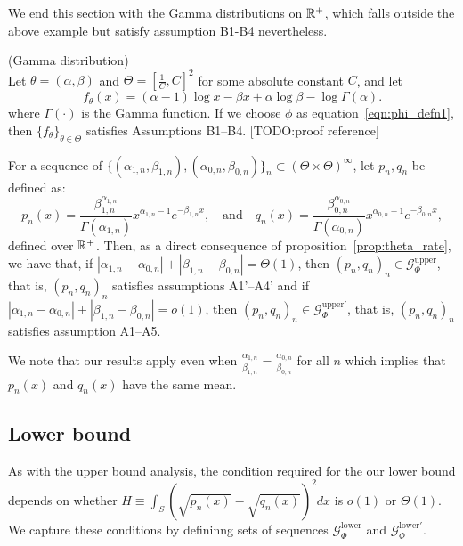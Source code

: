 \documentclass{article}
\begin{document}
We end this section with the Gamma distributions on ${\mathbb R}^+$, which falls outside the above example but satisfy assumption B1-B4 nevertheless.

\begin{example} (Gamma distribution)\\

Let $\theta = (\alpha, \beta)$ and $\Theta = [\frac{1}{C}, C]^2$ for some absolute constant $C$, and let
$$
f_{\theta}(x) = (\alpha - 1) \log x - \beta x + \alpha \log \beta - \log \Gamma(\alpha).
$$
where $\Gamma(\cdot)$ is the Gamma function. If we choose $\phi$ as equation~\eqref{eqn:phi_defn1}, then $\{ f_\theta \}_{\theta \in \Theta}$ satisfies Assumptions B1--B4. [TODO:proof reference]



For a sequence of $\{(\alpha_{1,n}, \beta_{1,n}), (\alpha_{0,n}, \beta_{0,n})\}_n \subset (\Theta \times \Theta)^\infty$, let $p_n, q_n$ be defined as:
\[
p_n(x) = \frac{\beta_{1,n}^{\alpha_{1,n}}}{\Gamma(\alpha_{1,n})} x^{\alpha_{1,n} - 1} e^{- \beta_{1,n} x}, \quad \text{and} \quad
q_n(x) = \frac{\beta_{0,n}^{\alpha_{0,n}}}{\Gamma(\alpha_{0,n})} x^{\alpha_{0,n} - 1} e^{- \beta_{0,n} x},
\]
defined over ${\mathbb R}^+$. Then, as a direct consequence of proposition~\ref{prop:theta_rate}, we have that, if $|\alpha_{1,n} - \alpha_{0,n}| + |\beta_{1,n} - \beta_{0,n} |  = \Theta(1)$, then $(p_n, q_n)_n \in \mathcal{G}^{\textrm{upper}}_\Phi$, that is, $(p_n, q_n)_n$ satisfies assumptions A1'--A4' and if  $ |\alpha_{1,n} - \alpha_{0,n}| + |\beta_{1,n} - \beta_{0,n}| = o(1)$, then $(p_n, q_n)_n \in \mathcal{G}^{\textrm{upper} \prime}_\Phi$, that is, $(p_n, q_n)_n$ satisfies assumption A1--A5.

\end{example}

We note that our results apply even when $\frac{\alpha_{1,n}}{\beta_{1,n}} = \frac{\alpha_{0,n}}{\beta_{0,n}}$ for all $n$ which implies that $p_n(x)$ and $q_n(x)$ have the same mean.


\subsection{Lower bound}
\label{sec:lower_bound}


As with the upper bound analysis, the condition required for the our lower bound depends on whether $H \equiv \int_S (\sqrt{p_n(x)} - \sqrt{q_n(x)})^2 dx$ is $o(1)$ or $\Theta(1)$. We capture these conditions by defininng sets of sequences $\mathcal{G}^{\textrm{lower}}_\Phi$ and $\mathcal{G}^{\textrm{lower}\prime}_\Phi$.
\end{document}
